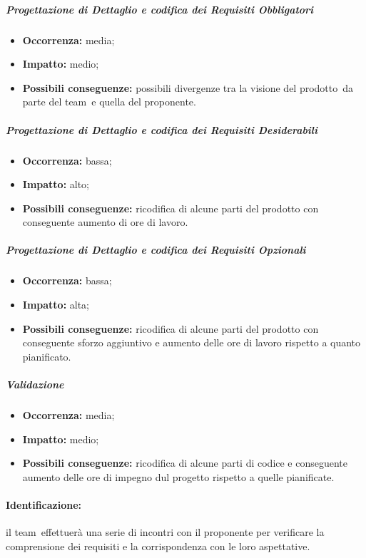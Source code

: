 \documentclass[../PianoProgetto.tex]{subfiles}
\begin{document}
		\subparagraph*{Progettazione di Dettaglio e codifica dei Requisiti Obbligatori}
			\begin{itemize}[label={-}]
				\item \textbf{Occorrenza:} media;
				\item \textbf{Impatto:} medio;
				\item \textbf{Possibili conseguenze:} possibili divergenze tra la visione del prodotto\g\ da parte del team\g\ e quella del proponente.
			\end{itemize}
			
		\subparagraph*{Progettazione di Dettaglio e codifica dei Requisiti Desiderabili}
			\begin{itemize}[label={-}]
				\item \textbf{Occorrenza:} bassa;
				\item \textbf{Impatto:} alto;
				\item \textbf{Possibili conseguenze:} ricodifica di alcune parti del prodotto con conseguente aumento di ore di lavoro.
			\end{itemize}
			
		\subparagraph*{Progettazione di Dettaglio e codifica dei Requisiti Opzionali}
			\begin{itemize}[label={-}]
				\item \textbf{Occorrenza:} bassa;
				\item \textbf{Impatto:} alta;
				\item \textbf{Possibili conseguenze:} ricodifica di alcune parti del prodotto con conseguente sforzo aggiuntivo e aumento delle ore di lavoro rispetto a quanto pianificato.
			\end{itemize}
			
		\subparagraph*{Validazione}
			\begin{itemize}[label={-}]
				\item \textbf{Occorrenza:} media;
				\item \textbf{Impatto:} medio;
				\item \textbf{Possibili conseguenze:} ricodifica di alcune parti di codice e conseguente aumento delle ore di impegno dul progetto rispetto a quelle pianificate.
			\end{itemize}
		
	\paragraph*{Identificazione:} il team\g\ effettuerà una serie di incontri con il proponente per verificare la comprensione dei requisiti e la corrispondenza con le loro aspettative.
	
\end{document}

